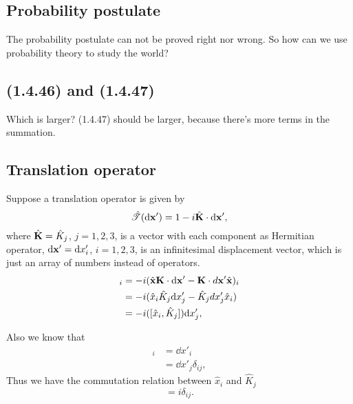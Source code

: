 \documentclass[10pt]{article}
\begin{document}
	\subsection{Probability postulate}

	The probability postulate can not be proved right nor wrong. So how can we use probability theory to study the world?

	\subsection{(1.4.46) and (1.4.47)}

	Which is larger? (1.4.47) should be larger, because there's more terms in the summation.

	\subsection{Translation operator}

	Suppose a translation operator is given by
	\begin{equation}
		\hat{\mathscr{T}}(\dd \bfx') = 1-i\hat{\bfK}\cdot \dd\bfx',
	\end{equation}
	where $\hat{{\bf K}} = \hat{K}_j$, $j = 1,2,3$, is a vector with each component as Hermitian operator, $\dd \bfx' = \dd x'_i$, $i = 1,2,3$, is an infinitesimal displacement vector, which is just an array of numbers instead of operators.
	\begin{align*}
		[\hat{\bfx}, \hat{\mathscr{T}}(d\bfx')]_i &= -i (\hat{\bfx} \bfK\cdot \dd\bfx' - \bfK\cdot d\bfx'\hat{\bfx})_i \\
		&= -i(\hat{x}_i \hat{K}_j \dd x'_j - \hat{K}_j dx'_j \hat{x}_i) \\
		&= -i([\hat{x}_i, \hat{K}_j]) \dd x'_j,
	\end{align*}

	Also we know that
	\begin{align*}
		[\hat{\bfx}, \hat{\mathscr{T}}(d\bfx')]_i &= \dd x'_i \\
		&= \dd x'_j \delta_{ij},
	\end{align*}
	Thus we have the commutation relation between $\hat{x}_i$ and $\hat{K}_j$
	\begin{equation}
		[\hat{x}_i, \hat{K}_j] = i \delta_{ij}.
	\end{equation}
\end{document}
